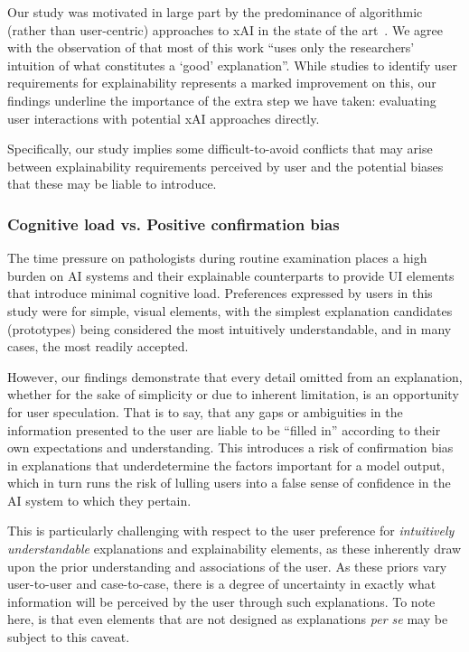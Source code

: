 Our study was motivated in large part by the predominance of algorithmic (rather than user-centric) approaches to xAI in the state of the art~\cite{tjoa_survey_2020, poceviciute_survey_2020, antoniadi2021current}. We agree with the observation of \citet{miller2019explanation} that most of this work ``uses only the researchers' intuition of what constitutes a ‘good’ explanation''. While studies to identify user requirements for explainability represents a marked improvement on this, our findings underline the importance of the extra step we have taken: evaluating user interactions with potential xAI approaches directly.

Specifically, our study implies some difficult-to-avoid conflicts that may arise between explainability requirements perceived by user and the potential biases that these may be liable to introduce.

\subsubsection{Cognitive load vs. Positive confirmation bias}

The time pressure on pathologists during routine examination places a high burden on AI systems and their explainable counterparts to provide UI elements that introduce minimal cognitive load. Preferences expressed by users in this study were for simple, visual elements, with the simplest explanation candidates (prototypes) being considered the most intuitively understandable, and in many cases, the most readily accepted.

However, our findings demonstrate that every detail omitted from an explanation, whether for the sake of simplicity or due to inherent limitation, is an opportunity for user speculation. That is to say, that any gaps or ambiguities in the information presented to the user are liable to be ``filled in'' according to their own expectations and understanding. This introduces a risk of confirmation bias in explanations that underdetermine the factors important for a model output, which in turn runs the risk of lulling users into a false sense of confidence in the AI system to which they pertain.

This is particularly challenging with respect to the user preference for \textit{intuitively understandable} explanations and explainability elements, as these inherently draw upon the prior understanding and associations of the user. As these priors vary user-to-user and case-to-case, there is a degree of uncertainty in exactly what information will be perceived by the user through such explanations. To note here, is that even elements that are not designed as explanations \textit{per se} may be subject to this caveat.

